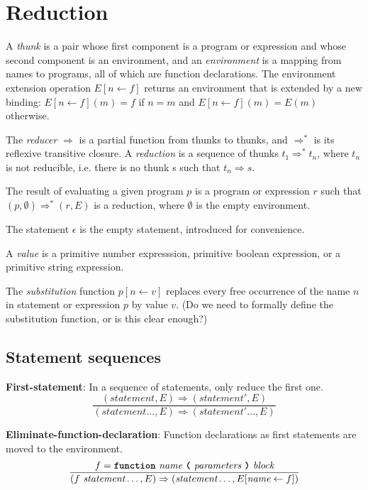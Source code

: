 \section*{Reduction}

A \emph{thunk} is a pair whose first component is a program or expression
and whose
second component is an environment, and an 
\emph{environment} is a mapping from names to programs, all of which are
function declarations. The environment extension operation
$E [ n \leftarrow f]$ returns an environment that is extended by
a new binding: $E[n \leftarrow f](m) = f$ if $n = m$ and
$E[n \leftarrow f](m) = E(m)$ otherwise.

The \emph{reducer} $\Rightarrow$ is a partial function from thunks to thunks,
and $\Rightarrow^*$ is its reflexive transitive closure.
A \emph{reduction} is a sequence of thunks
$t_1 \Rightarrow^* t_n$, where $t_n$ is not reducible, i.e. there is no thunk
s such that $t_n \Rightarrow s$.

The result of evaluating a given program $p$ is a program or expression $r$
such that $(p, \emptyset) \Rightarrow^* (r, E)$ is a reduction,
where $\emptyset$ is the empty environment.

The statement $\epsilon$ is the empty statement, introduced for convenience.

A \emph{value} is a primitive number expresssion, primitive boolean expression,
or a primitive string expression.

The \emph{substitution} function
$p [ n \leftarrow v ]$ replaces every free occurrence of the name $n$
in statement or expression $p$ by value $v$.
(Do we need to formally define the substitution function, or is this clear
enough?)


\subsection*{Statement sequences}


\textbf{First-statement}: In a sequence of statements, only reduce the first
one.
\[
\frac{
  (\textit{statement},E) \Rightarrow (\textit{statement}',E)
}{  
  (\textit{statement} \ldots, E)
  \Rightarrow 
  (\textit{statement}' \ldots, E)
}
\]

\vspace{10mm}

\textbf{Eliminate-function-declaration}: Function declarations as first
statements are moved to the environment.
\[
\frac{
             f = \textbf{\texttt{function}}\  \textit{name} \ 
                 \textbf{\texttt{(}}\  \textit{parameters}
                 \ \textbf{\texttt{)}}\ \textit{block}  
}{
( f\ \textit{statement} \ldots, E)
  \Rightarrow
  ( \textit{statement} \ldots, E[\textit{name} \leftarrow f])
}
\]

